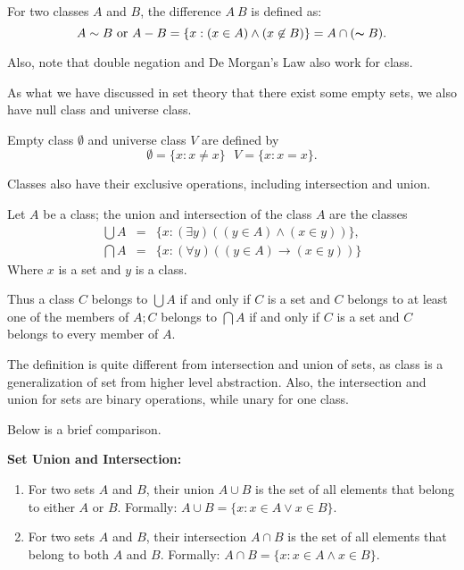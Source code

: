 \begin{definition}
For two classes $A$ and $B$, the difference $A~B$ is defined as:
$$
A\sim B \text{ or } A-B=\{x:(x\in A)\land(x\not\in B)\}=A\cap(\thicksim B).
$$
\end{definition}
Also, note that double negation and De Morgan's Law also work for class.

As what we have discussed in set theory that there exist some empty sets, we also have null class and
universe class.
\begin{definition}
    Empty class $\emptyset$ and universe class $V$ are defined by
    $$\emptyset=\{x:x\neq x\}\ \ \ V=\{x:x=x\}.$$
\end{definition}
Classes also have their exclusive operations, including intersection and union.
\begin{definition}\label{intofclass}
    Let $A$ be a class; the union and intersection of the class $A$ are
    the classes
    $$
    \begin{array}{rcl}\bigcup A&=&\{x:(\exists y)((y\in A)\land(x\in y))\},\\
        \bigcap A&=&\{x:(\forall y)((y\in A)\to (x\in y))\}\end{array}
    $$
    Where $x$ is a set and $y$ is a class.
\end{definition}
Thus a class $C$ belongs to $\bigcup A$ if and only if $C$ is a set and $C$ belongs to at least one of the 
members of $A;C$ belongs to $\bigcap A$ if and only if $C$ is a set and $C$ belongs to every member of $A.$

The definition is quite different from intersection and union of sets, as class is a generalization
of set from higher level abstraction. Also, the intersection and union for sets are binary operations,
while unary for one class. 

Below is a brief comparison.

\textbf{Set Union and Intersection:}
\begin{enumerate}
\item For two sets $A$ and $B$, their union $A \cup B$ is the set of all elements that belong to either $A$ or $B$. Formally: $A \cup B = \{x : x \in A \lor x \in B\}$.
\item For two sets $A$ and $B$, their intersection $A \cap B$ is the set of all elements that belong to both $A$ and $B$. Formally: $A \cap B = \{x : x \in A \land x \in B\}$.
\end{enumerate}

